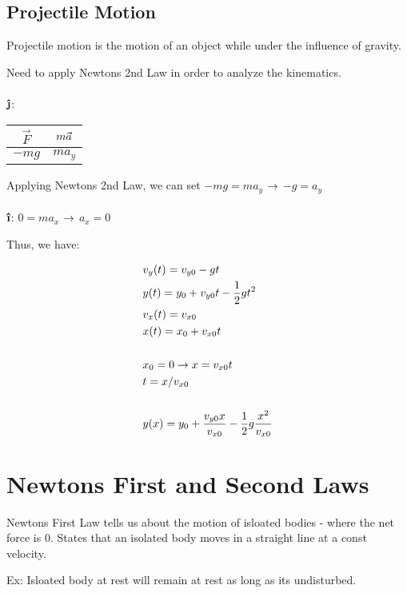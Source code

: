 \documentclass{report}
\begin{document}
\section{Projectile Motion}
Projectile motion is the motion of an object while under the influence of gravity. 

Need to apply Newtons 2nd Law in order to analyze the kinematics.
\\
\\
$\jhat$:
\begin{tabular}{|c|c|}
  \hline
  $\vec{F}$ & $m \vec{a}$\\
  \hline
  $-mg$ & $ma_y$\\
  \hline
\end{tabular}
Applying Newtons 2nd Law, we can set $-mg = ma_y$ $\rightarrow$ $-g = a_y$
\\
\\
$\ihat$: $0 = ma_x$ $\rightarrow$ $a_x = 0$ 

Thus, we have:

\begin{align}
  &v_y (t) = v_{y0} - gt  \\
  &y(t) = y_0 + v_{y0}t - \frac{1}{2} g t^2 \notag\\
  &v_x (t) = v_{x0} \\
  &x(t) = x_0 + v_{x0} t \notag \\
  \notag \\
  &x_0 = 0 \rightarrow x = v_{x0} t\notag\\
  &t = x/v_{x0}\notag\\
  \notag \\
  &y(x) = y_0 + \frac{v_{y0}x}{v_{x0}} - \frac{1}{2} g \frac{x^2}{v_{x0}}
\end{align} 

\newpage

\chapter{Newtons First and Second Laws}
Newtons First Law tells us about the motion of isloated bodies - where the net force is 0. States that an isolated body moves in a straight line at a const velocity. 

Ex: Isloated body at rest will remain at rest as long as its undisturbed. 
\end{document}
